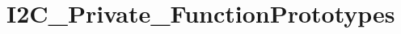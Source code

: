 \hypertarget{group___i2_c___private___function_prototypes}{}\section{I2\+C\+\_\+\+Private\+\_\+\+Function\+Prototypes}
\label{group___i2_c___private___function_prototypes}
